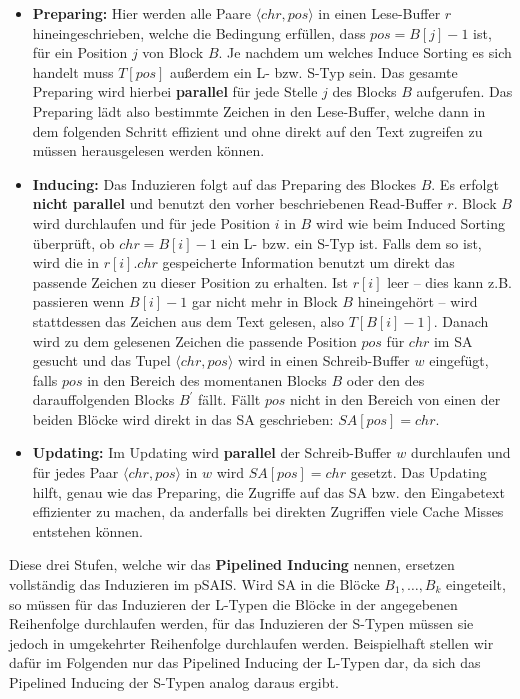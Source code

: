 \begin{itemize}
\item \textbf{Preparing:} Hier werden alle Paare $\langle chr, pos \rangle$ in einen Lese-Buffer $r$ hineingeschrieben, welche die Bedingung erfüllen, dass $pos = B[j]-1$ ist, für ein Position $j$ von Block $B$. Je nachdem um welches Induce Sorting es sich handelt muss $T[pos]$ außerdem ein L- bzw. S-Typ sein. Das gesamte Preparing wird hierbei \textbf{parallel} für jede Stelle $j$ des Blocks $B$ aufgerufen. Das Preparing lädt also bestimmte Zeichen in den Lese-Buffer, welche dann in dem folgenden Schritt effizient und ohne direkt auf den Text zugreifen zu müssen herausgelesen werden können.

\item \textbf{Inducing:} Das Induzieren folgt auf das Preparing des Blockes $B$. Es erfolgt \textbf{nicht parallel} und benutzt den vorher beschriebenen Read-Buffer $r$. Block $B$ wird durchlaufen und für jede Position $i$ in $B$ wird wie beim Induced Sorting überprüft, ob $chr = B[i]-1$ ein L- bzw. ein S-Typ ist. Falls dem so ist, wird die in $r[i].chr$ gespeicherte Information benutzt um direkt das passende Zeichen zu dieser Position zu erhalten. Ist $r[i]$ leer -- dies kann z.B. passieren wenn $B[i]-1$ gar nicht mehr in Block $B$ hineingehört -- wird stattdessen das Zeichen aus dem Text gelesen, also $T[B[i]-1]$. Danach wird zu dem gelesenen Zeichen die passende Position $pos$ für $chr$ im SA gesucht und das Tupel $\langle chr, pos \rangle$ wird in einen Schreib-Buffer $w$ eingefügt, falls $pos$ in den Bereich des momentanen Blocks $B$ oder den des darauffolgenden Blocks $B^\prime$ fällt. Fällt $pos$ nicht in den Bereich von einen der beiden Blöcke wird direkt in das SA geschrieben: $SA[pos] = chr$.

\item \textbf{Updating:} Im Updating wird \textbf{parallel} der Schreib-Buffer $w$ durchlaufen und für jedes Paar $\langle chr, pos \rangle$ in $w$ wird $SA[pos] = chr$ gesetzt. Das Updating hilft, genau wie das Preparing, die Zugriffe auf das SA bzw. den Eingabetext effizienter zu machen, da anderfalls bei direkten Zugriffen viele Cache Misses entstehen können.
\end{itemize}

Diese drei Stufen, welche wir das \textbf{Pipelined Inducing} nennen, ersetzen vollständig das Induzieren im pSAIS. Wird SA in die Blöcke $B_1, \ldots, B_k$ eingeteilt, so müssen für das Induzieren der L-Typen die Blöcke in der angegebenen Reihenfolge durchlaufen werden, für das Induzieren der S-Typen müssen sie jedoch in umgekehrter Reihenfolge durchlaufen werden. Beispielhaft stellen wir dafür im Folgenden nur das Pipelined Inducing der L-Typen dar, da sich das Pipelined Inducing der S-Typen analog daraus ergibt.


